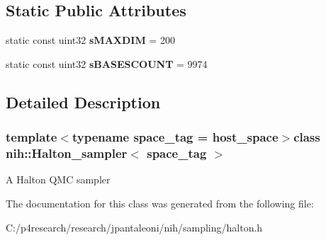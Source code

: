 \subsection*{\-Static \-Public \-Attributes}
\begin{DoxyCompactItemize}
\item 
\hypertarget{classnih_1_1_halton__sampler_a3d789d0a1c647db400142f5fb06d9776}{
static const uint32 {\bfseries s\-M\-A\-X\-D\-I\-M} = 200}
\label{classnih_1_1_halton__sampler_a3d789d0a1c647db400142f5fb06d9776}

\item 
\hypertarget{classnih_1_1_halton__sampler_ac1a93f3c43b48c795d26c4f868c78f0f}{
static const uint32 {\bfseries s\-B\-A\-S\-E\-S\-C\-O\-U\-N\-T} = 9974}
\label{classnih_1_1_halton__sampler_ac1a93f3c43b48c795d26c4f868c78f0f}

\end{DoxyCompactItemize}


\subsection{\-Detailed \-Description}
\subsubsection*{template$<$typename space\-\_\-tag = host\-\_\-space$>$class nih\-::\-Halton\-\_\-sampler$<$ space\-\_\-tag $>$}

\-A \-Halton \-Q\-M\-C sampler 

\-The documentation for this class was generated from the following file\-:\begin{DoxyCompactItemize}
\item 
\-C\-:/p4research/research/jpantaleoni/nih/sampling/halton.\-h\end{DoxyCompactItemize}
